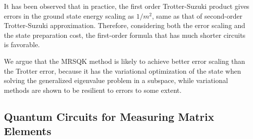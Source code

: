 \documentclass[journal=jctcce,manuscript=article]{achemso}
\newcommand{\methodabbr}[0]{MRSQK\xspace}
\begin{document}
It has been observed that in practice, the first order Trotter-Suzuki product gives errors in the ground state energy scaling as $1/m^2$,\cite{Hastings:2015uj} same as that of second-order Trotter-Suzuki approximation. Therefore, considering both the error scaling and the state preparation cost, the first-order formula that has much shorter circuits is favorable.

We argue that the \methodabbr method is likely to achieve better error scaling than the Trotter error, because it has the variational optimization of the state when solving the generalized eigenvalue problem in a subspace, while variational methods are shown to be resilient to errors to some extent.\cite{McClean:2015bs, OMalley:2016dc}

\subsection{Quantum Circuits for Measuring Matrix Elements} 
\end{document}
